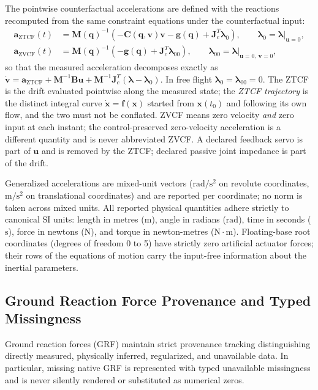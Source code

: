 \documentclass[11pt,a4paper]{article}
\begin{document}
The pointwise counterfactual accelerations are defined with the reactions recomputed from the same constraint equations under the counterfactual input:
\begin{align}
\mathbf{a}_{\mathrm{ZTCF}}(t) &= \mathbf{M}(\mathbf{q})^{-1} \left( -\mathbf{C}(\mathbf{q},\mathbf{v})\mathbf{v} - \mathbf{g}(\mathbf{q}) + \mathbf{J}_c^T \boldsymbol{\lambda}_0 \right), \qquad \boldsymbol{\lambda}_0 = \boldsymbol{\lambda}\big|_{\mathbf{u}=0}, \\[4pt]
\mathbf{a}_{\mathrm{ZVCF}}(t) &= \mathbf{M}(\mathbf{q})^{-1} \left( - \mathbf{g}(\mathbf{q}) + \mathbf{J}_c^T \boldsymbol{\lambda}_{00} \right), \qquad \boldsymbol{\lambda}_{00} = \boldsymbol{\lambda}\big|_{\mathbf{u}=0,\,\mathbf{v}=0},
\end{align}
so that the measured acceleration decomposes exactly as $\dot{\mathbf{v}} = \mathbf{a}_{\mathrm{ZTCF}} + \mathbf{M}^{-1}\mathbf{B}\mathbf{u} + \mathbf{M}^{-1}\mathbf{J}_c^T(\boldsymbol{\lambda}-\boldsymbol{\lambda}_0)$. In free flight $\boldsymbol{\lambda}_0 = \boldsymbol{\lambda}_{00} = 0$. The ZTCF is the drift evaluated pointwise along the measured state; the \emph{ZTCF trajectory} is the distinct integral curve $\dot{\mathbf{x}} = \mathbf{f}(\mathbf{x})$ started from $\mathbf{x}(t_0)$ and following its own flow, and the two must not be conflated. ZVCF means zero velocity \emph{and} zero input at each instant; the control-preserved zero-velocity acceleration is a different quantity and is never abbreviated ZVCF. A declared feedback servo is part of $\mathbf{u}$ and is removed by the ZTCF; declared passive joint impedance is part of the drift.

Generalized accelerations are mixed-unit vectors ($\mathrm{rad/s^2}$ on revolute coordinates, $\mathrm{m/s^2}$ on translational coordinates) and are reported per coordinate; no norm is taken across mixed units. All reported physical quantities adhere strictly to canonical SI units: length in metres ($\mathrm{m}$), angle in radians ($\mathrm{rad}$), time in seconds ($\mathrm{s}$), force in newtons ($\mathrm{N}$), and torque in newton-metres ($\mathrm{N\cdot m}$). Floating-base root coordinates (degrees of freedom 0 to 5) have strictly zero artificial actuator forces; their rows of the equations of motion carry the input-free information about the inertial parameters.

\subsection{Ground Reaction Force Provenance and Typed Missingness}
Ground reaction forces (GRF) maintain strict provenance tracking distinguishing directly measured, physically inferred, regularized, and unavailable data. In particular, missing native GRF is represented with typed unavailable missingness and is never silently rendered or substituted as numerical zeros.
\end{document}

